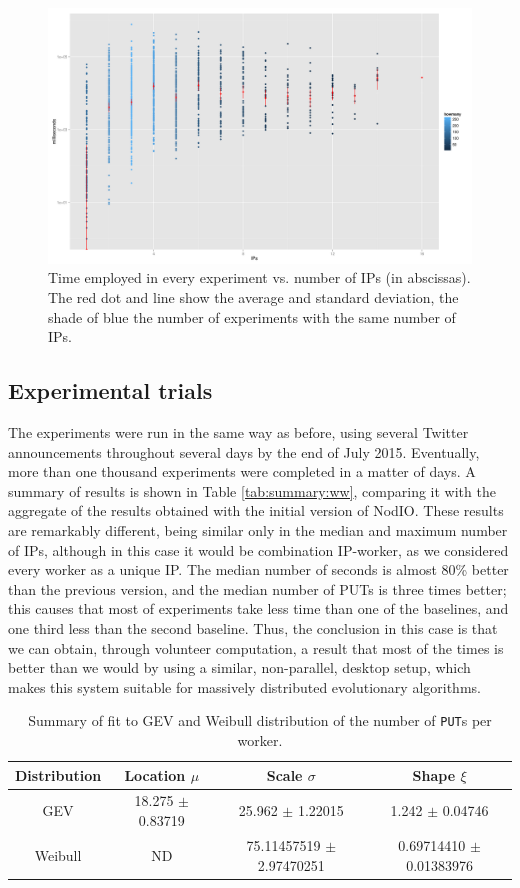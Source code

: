 \documentclass[journal,onecolumn]{IEEEtran}
\begin{document}
%
\begin{figure}[!htb]
\centering
\includegraphics[width=0.9\linewidth]{ips-time-ww.png}
\caption{Time employed in every experiment vs. number of IPs (in
  abscissas). The red dot and line show the average and standard
  deviation, the shade of blue the number of experiments with the same
  number of IPs. } 
\label{fig:ipstime:w2}
\end{figure}

\subsection{Experimental trials}
\label{sec:w2Exp}

The experiments were run in the same way as before, using several
Twitter announcements throughout several days by the end of July
2015. Eventually, more than one thousand experiments were completed in
a matter of days. A summary of results is shown in Table
\ref{tab:summary:ww}, comparing it with the aggregate of the results
obtained with the initial version of {\sf NodIO}. These results are
remarkably different, being similar only in the median and maximum
number of IPs, although in this case it would be combination
IP-worker, as we considered every worker as a unique IP. The median
number of seconds is almost 80\% better than the previous version, and
the median number of PUTs is three times better; this causes that most
of experiments take less time than one of the baselines, and one third
less than the second baseline. Thus, the conclusion in this case is
that we can obtain, through volunteer computation, a result that most 
of the times is better than we would by using a similar, non-parallel,
desktop setup, which makes this system suitable for massively
distributed evolutionary algorithms.
%
\begin{table}
\caption{Summary of fit to GEV and Weibull distribution of
  the number of {\tt PUT}s per worker. \label{tab:puts:ww}}
\begin{center}
\begin{tabular}{cccc}
\hline
Distribution & Location $\mu$ & Scale $\sigma$ & Shape $\xi$ \\
\hline
GEV & 18.275 $\pm$ 0.83719  &  25.962  $\pm$ 1.22015 & 1.242   $\pm$
0.04746 \\
Weibull & ND & 75.11457519 $\pm$ 2.97470251  & 0.69714410 $\pm$ 0.01383976 \\
\hline
\end{tabular}
\end{center}
\end{table}
%
\end{document}
